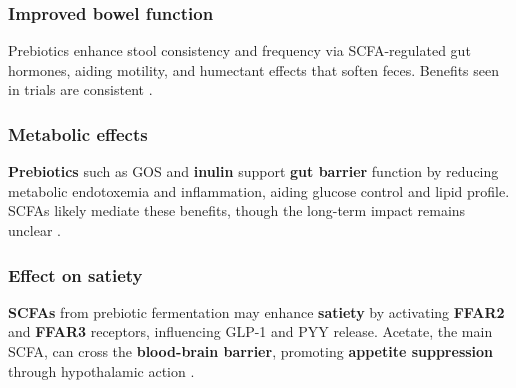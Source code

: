 \subsubsection*{Improved bowel function}
Prebiotics enhance stool consistency and frequency via SCFA-regulated gut hormones, aiding motility, and humectant effects that soften feces. Benefits seen in trials are consistent \cite*{L10-Pro_Pre}.

\subsubsection*{Metabolic effects}
\textbf{Prebiotics} such as GOS and \textbf{inulin} support \textbf{gut barrier} function by reducing metabolic endotoxemia and inflammation, aiding glucose control and lipid profile. SCFAs likely mediate these benefits, though the long-term impact remains unclear \cite*{L10-Pro_Pre}.

\subsubsection*{Effect on satiety}
\textbf{SCFAs} from prebiotic fermentation may enhance \textbf{satiety} by activating \textbf{FFAR2} and \textbf{FFAR3} receptors, influencing GLP-1 and PYY release. Acetate, the main SCFA, can cross the \textbf{blood-brain barrier}, promoting \textbf{appetite suppression} through hypothalamic action \cite*{L10-Pro_Pre}.











